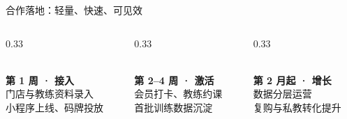 \documentclass[aspectratio=169,11pt]{ctexbeamer}
\begin{document}

\begin{frame}{合作落地：轻量、快速、可见效}

  \vspace{0.5em}

  \begin{columns}[T]

    \begin{column}{0.33\textwidth}

      \begin{center}

        {\color{dachuan}\huge\faRocket}\\[6pt]\textbf{第 1 周 · 接入}\\[4pt]

        {\color{txtsub}\small 门店与教练资料录入\\小程序上线、码牌投放}

      \end{center}

    \end{column}

    \begin{column}{0.33\textwidth}

      \begin{center}

        {\color{dachuan}\huge\faUsers}\\[6pt]\textbf{第 2–4 周 · 激活}\\[4pt]

        {\color{txtsub}\small 会员打卡、教练约课\\首批训练数据沉淀}

      \end{center}

    \end{column}

    \begin{column}{0.33\textwidth}

      \begin{center}

        {\color{dachuan}\huge\faChartLine}\\[6pt]\textbf{第 2 月起 · 增长}\\[4pt]

        {\color{txtsub}\small 数据分层运营\\复购与私教转化提升}

      \end{center}


\end{column}
\end{columns}
\end{frame}
\end{document}
